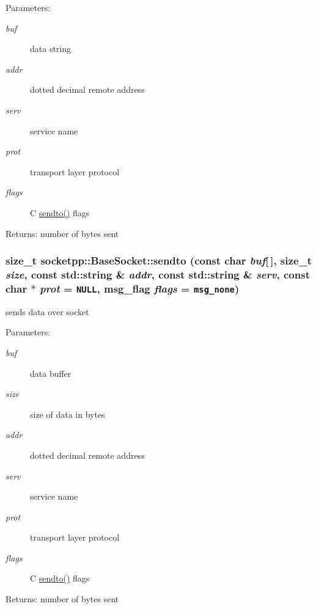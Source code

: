 \begin{CompactItemize}
\begin{Desc}
\item[Parameters:]
\begin{description}
\item[{\em buf}]data string \item[{\em addr}]dotted decimal remote address \item[{\em serv}]service name \item[{\em prot}]transport layer protocol \item[{\em flags}]C \hyperlink{classsocketpp_1_1BaseSocket_d6df36281c6fce81e5c4c493ac91a6f8}{sendto()} flags \end{description}
\end{Desc}
\begin{Desc}
\item[Returns:]number of bytes sent \end{Desc}
\hypertarget{classsocketpp_1_1BaseSocket_31b240c268f150718c7411da62efff7d}{
\subsubsection[{sendto}]{\setlength{\rightskip}{0pt plus 5cm}size\_\-t socketpp::BaseSocket::sendto (const char {\em buf}\mbox{[}$\,$\mbox{]}, \/  size\_\-t {\em size}, \/  const std::string \& {\em addr}, \/  const std::string \& {\em serv}, \/  const char $\ast$ {\em prot} = {\tt NULL}, \/  msg\_\-flag {\em flags} = {\tt msg\_\-none})}}
\label{classsocketpp_1_1BaseSocket_31b240c268f150718c7411da62efff7d}


sends data over socket 

\begin{Desc}
\item[Parameters:]
\begin{description}
\item[{\em buf}]data buffer \item[{\em size}]size of data in bytes \item[{\em addr}]dotted decimal remote address \item[{\em serv}]service name \item[{\em prot}]transport layer protocol \item[{\em flags}]C \hyperlink{classsocketpp_1_1BaseSocket_d6df36281c6fce81e5c4c493ac91a6f8}{sendto()} flags \end{description}
\end{Desc}
\begin{Desc}
\item[Returns:]number of bytes sent \end{Desc}
\hypertarget{classsocketpp_1_1BaseSocket_d3b26301f9af47aa8bdcf38c32ba8c9d}{
}
\end{CompactItemize}
